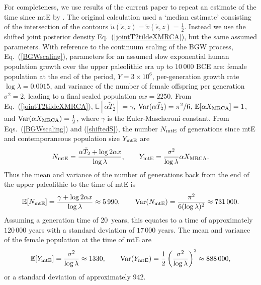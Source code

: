 \documentclass[preprint,12pt]{elsarticle}
\begin{document}
For completeness, we use results of the current paper to repeat an estimate of the time since mtE by \citet[Section~6]{burden2016genetic}.  The original calculation 
used a `median estimate' consisting of the intersection of the contours $\tilde{u}(\tilde{s}, z) = \tilde{v}(\tilde{s}, z) = \tfrac{1}{2}$.  Instead we use the 
shifted joint posterior density Eq.~(\ref{jointT2tildeXMRCA}), but the same assumed parameters.  With reference to the continuum scaling of the BGW process, Eq.~(\ref{BGWscaling}), 
parameters for an assumed slow exponential human population growth over the upper paleolithic era up to $10\,000$ BCE are: female population 
at the end of the period, $Y = 3 \times 10^6$, per-generation growth rate $\log\lambda = 0.0015$, and variance of the number of female offspring 
per generation $\sigma^2 = 2$, leading to a final scaled population $\alpha x = 2250$.   From Eq.~(\ref{jointT2tildeXMRCA}), 
$\mathbb{E}[\alpha \tilde{T}_2] = \gamma$, ${\rm Var}(\alpha \tilde{T}_2) = \pi^2/6$, $\mathbb{E}[\alpha X_{\rm MRCA}] = 1$, 
and ${\rm Var}(\alpha X_{\rm MRCA}) = \tfrac{1}{2}$, where $\gamma$ is the Euler-Mascheroni constant.  From Eqs.~(\ref{BGWscaling}) 
and (\ref{shiftedS}), the number $N_{\rm mtE}$ of generations since mtE and contemporaneous population size $Y_{\rm mtE}$ 
are 
\[
N_{\rm mtE} = \frac{\alpha \tilde{T}_2 + \log 2\alpha x}{\log\lambda}, \qquad Y_{\rm mtE} = \frac{\sigma^2}{\log\lambda} \alpha X_{\rm MRCA}. 
\]
Thus the mean and variance of the number of generations back from the end of the upper paleolithic to the time of mtE is 
\[
\mathbb{E}[N_{\rm mtE}] = \frac{\gamma + \log 2\alpha x}{\log\lambda} \approx 5\,990, \qquad 
	{\rm Var}(N_{\rm mtE}) = \frac{\pi^2}{6 (\log\lambda)^2} \approx 731\,000. 
\]
Assuming a generation time of 20~years, this equates to a time of approximately $120\,000$ years with a standard deviation of $17\,000$ years.  
The mean and variance of the female population at the time of mtE are 
\[
\mathbb{E}[Y_{\rm mtE}] = \frac{\sigma^2}{\log\lambda} \approx 1330, \qquad 
		{\rm Var}(Y_{\rm mtE}) = \frac{1}{2} \left(\frac{\sigma^2}{\log\lambda}\right)^2 \approx 888\,000, 
\]
or a standard deviation of approximately 942.  
\end{document}
